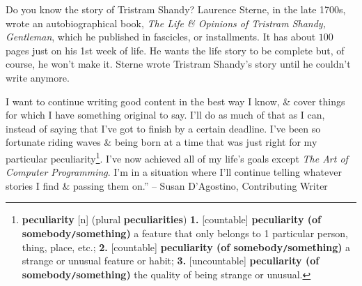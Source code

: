\documentclass[oneside]{book}
\numberwithin{equation}{section}
\begin{document}
Do you know the story of Tristram Shandy? Laurence Sterne, in the late 1700s, wrote an autobiographical book, \textit{The Life \& Opinions of Tristram Shandy, Gentleman}, which he published in fascicles, or installments. It has about $100$ pages just on his 1st week of life. He wants the life story to be complete but, of course, he won't make it. Sterne wrote Tristram Shandy's story until he couldn't write anymore.

I want to continue writing good content in the best way I know, \& cover things for which I have something original to say. I'll do as much of that as I can, instead of saying that I've got to finish by a certain deadline. I've been so fortunate riding waves \& being born at a time that was just right for my particular peculiarity\footnote{\textbf{peculiarity} [n] (plural \textbf{peculiarities}) \textbf{1.} [countable] \textbf{peculiarity (of somebody\texttt{/}something)} a feature that only belongs to 1 particular person, thing, place, etc.; \textbf{2.} [countable] \textbf{peculiarity (of somebody\texttt{/}something)} a strange or unusual feature or habit; \textbf{3.} [uncountable] \textbf{peculiarity (of somebody\texttt{/}something)} the quality of being strange or unusual.}. I've now achieved all of my life's goals except \textit{The Art of Computer Programming}. I'm in a situation where I'll continue telling whatever stories I find \& passing them on.'' -- Susan D'Agostino, Contributing Writer


\printbibliography[heading=bibintoc]
	
\end{document}
